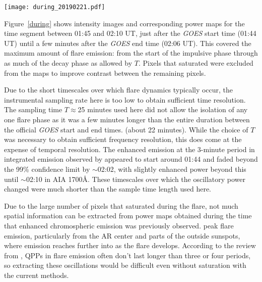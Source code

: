 \begin{figure*}[htb!]\centering
    \texttt{[image: during\_20190221.pdf]}
    \caption{%
        Same as Figure~\ref{before},
        during the X-class flare between
        01:45 and 02:10 UT on 15 February 2011.
        \label{during}}
\end{figure*}


Figure~\ref{during}
shows intensity images and corresponding power maps for
the time segment between 01:45 and 02:10 UT,
just after the \textit{GOES} start time (01:44 UT) until
a few minutes after the \textit{GOES} end time (02:06 UT).
This covered the maximum amount of
flare emission: from the start of the impulsive phase through as much
of the decay phase as allowed by $T$.
Pixels that saturated were excluded from the maps
to improve contrast between the remaining pixels.
%

Due to the short timescales over which flare dynamics typically occur,
the instrumental sampling rate here is
too low to obtain sufficient time resolution.
The sampling time $T\approx$25 minutes used here
did not allow the isolation of any one flare phase
as it was a few minutes longer than the entire duration between
the official \textit{GOES} start and end times.
(about 22 minutes).
While the choice of $T$ was necessary to obtain sufficient frequency resolution,
this does come
at the expense of temporal resolution.
The enhanced emission at the 3-minute period in integrated emission
observed by \cite{Milligan2017} appeared to start around 01:44 and faded
beyond the 99\% confidence limit by $\sim$02:02, with slightly enhanced
power beyond this until $\sim$02:10 in AIA 1700\AA{}.
These timescales over which the oscillatory power changed
were much shorter than the sample time length used here.

Due to the large number of pixels that saturated during the flare,
not much spatial information can be extracted from power maps obtained
during the time that enhanced chromospheric emission was previously observed.
peak flare emission, particularly
from the AR center and parts of the outside sunspots, where
emission reaches further into as the flare develops.
According to the review from \cite{Inglis2009}, QPPs in flare emission
often don't last longer than three or four periods, so
extracting these oscillations would be difficult even without
saturation with the current methods.

